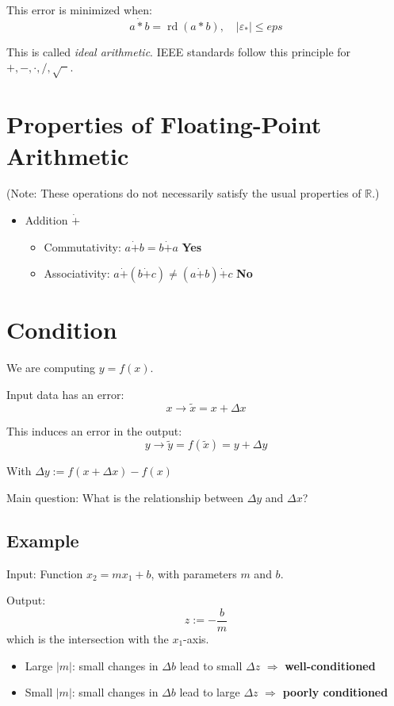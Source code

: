 \documentclass{article}
\begin{document}
This error is minimized when:
\[
a \dot{*} b = \operatorname{rd}(a * b), \quad |\varepsilon_*| \leq eps
\]

This is called \textit{ideal arithmetic}. IEEE standards follow this principle for $+, -, \cdot, /, \sqrt{\phantom{x}}$.

\section{Properties of Floating-Point Arithmetic}
(Note: These operations do not necessarily satisfy the usual properties of $\mathbb{R}$.)
\begin{itemize}
  \item Addition $\dot{+}$
  \begin{itemize}
    \item Commutativity: $a \dot{+} b = b \dot{+} a$ \quad \textbf{Yes}
    \item Associativity: $a \dot{+} (b \dot{+} c) \neq (a \dot{+} b) \dot{+} c$ \quad \textbf{No}
  \end{itemize}
\end{itemize}

\section{Condition}
\label{sec:condition}

We are computing $y = f(x)$.

Input data has an error:
\[
x \to \tilde{x} = x + \Delta x
\]

This induces an error in the output:
\[
y \to \tilde{y} = f(\tilde{x}) = y + \Delta y
\]

With $\Delta y := f(x + \Delta x) - f(x)$


Main question: What is the relationship between $\Delta y$ and $\Delta x$?

\subsection{Example}

Input: Function $x_2 = m x_1 + b$, with parameters $m$ and $b$.

Output: 
\[
z := -\frac{b}{m}
\]
which is the intersection with the $x_1$-axis.

\begin{itemize}
  \item Large $|m|$: small changes in $\Delta b$ lead to small $\Delta z$ $\Rightarrow$ \textbf{well-conditioned}
  \item Small $|m|$: small changes in $\Delta b$ lead to large $\Delta z$ $\Rightarrow$ \textbf{poorly conditioned}
\end{itemize}
\end{document}
